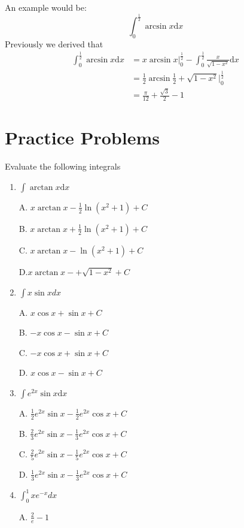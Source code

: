 \documentclass{article}
\numberwithin{equation}{section}
\begin{document}
An example would be:
\[
\int_{0}^{\frac{1}{2}} \arcsin x \mathrm{d}x
\]
Previously we derived that
\begin{align*}
    \int_{0}^{\frac{1}{2}} \arcsin x \mathrm{d}x &= x\arcsin x \Big|_0^{\frac{1}{2}}- \int_{0}^{\frac{1}{2}} \frac{x}{\sqrt{1-x^2}} \mathrm{d}x\\
    &= \frac{1}{2} \arcsin \frac{1}{2} + \sqrt{1-x^2} \Big|_{0}^{\frac{1}{2}}\\
    &= \frac{\pi}{12} + \frac{\sqrt{3}}{2} - 1
\end{align*}

\newpage
\section{Practice Problems}
Evaluate the following integrals
\begin{enumerate}
    \item $\displaystyle\int \arctan{x} \mathrm{d}x$
    
    A. $\displaystyle x\arctan{x} -\frac{1}{2}\ln{(x^2 + 1)} + C$

    B. $\displaystyle x\arctan x + \frac{1}{2}\ln (x^2+1)+C$

    C. $\displaystyle x\arctan{x} - \ln(x^2+1)+C$

    D.$\displaystyle x\arctan{x} -+ \sqrt{1-x^2} +C$

    \item $\displaystyle \int x\sin x dx$
    
    A. $x\cos x + \sin x +C$

    B. $-x\cos x - \sin x +C$

    C. $-x\cos x + \sin x +C$

    D. $x\cos x -\sin x +C$

    \item $\displaystyle \int e^{2x} \sin x \mathrm{d}x$
    
    A. $\displaystyle \frac{1}{2} e^{2x} \sin x - \frac{1}{2}e^{2x} \cos x + C$

    B. $\displaystyle \frac{2}{3}e^{2x}\sin x - \frac{1}{3} e^{2x} \cos x + C$

    C. $\displaystyle \frac{2}{5} e^{2x} \sin x - \frac{1}{5} e^{2x} \cos x + C$

    D. $\displaystyle \frac{1}{3} e^{2x} \sin x - \frac{1}{3} e^{2x} \cos x +C$

    \item $\displaystyle \int_{0}^{1} x e^{-x} dx$
    
    A. $\displaystyle \frac{2}{e} - 1$


\end{enumerate}
\end{document}
